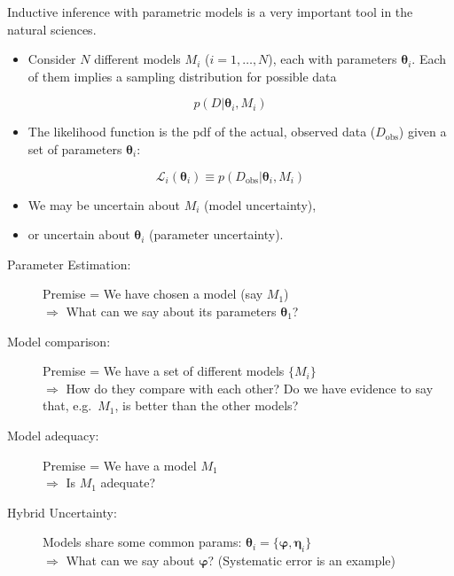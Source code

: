 \documentclass[%
oneside,                 %
final,                   %
10pt]{article}
\newenvironment{block_mdfboxadmon}[1][]{
\begin{block_mdfboxmdframed}[frametitle=#1]
}
{
\end{block_mdfboxmdframed}
}
\begin{document}
\begin{block_mdfboxadmon}[]
Inductive inference with parametric models is a very important tool in the natural sciences.
\begin{itemize}
\item Consider $N$ different models $M_i$ ($i = 1, \ldots, N$), each with parameters $\boldsymbol{\theta}_i$. Each of them implies a sampling distribution for possible data
\end{itemize}

\noindent
\[
p(D|\boldsymbol{\theta}_i, M_i)
\]

\begin{itemize}
\item The likelihood function is the pdf of the actual, observed data ($D_\mathrm{obs}$) given a set of parameters $\boldsymbol{\theta}_i$:
\end{itemize}

\noindent
\[
\mathcal{L}_i (\boldsymbol{\theta}_i) \equiv p(D_\mathrm{obs}|\boldsymbol{\theta}_i, M_i)
\]
\begin{itemize}
\item We may be uncertain about $M_i$ (model uncertainty),

\item or uncertain about $\boldsymbol{\theta}_i$ (parameter uncertainty).
\end{itemize}

\noindent
\end{block_mdfboxadmon} %




\begin{block_mdfboxadmon}[]
\begin{description}
\item[Parameter Estimation:] 
  Premise = We have chosen a model (say $M_1$)\\
  $\Rightarrow$ What can we say about its parameters $\boldsymbol{\theta}_1$?

\item[Model comparison:] 
  Premise = We have a set of different models $\{M_i\}$\\
  $\Rightarrow$ How do they compare with each other? Do we have evidence to say that, e.g.~$M_1$, is better than the other models?

\item[Model adequacy:] 
  Premise = We have a model $M_1$\\
  $\Rightarrow$ Is $M_1$ adequate?

\item[Hybrid Uncertainty:] 
  Models share some common params: $\boldsymbol{\theta}_i = \{ \boldsymbol{\varphi}, \boldsymbol{\eta}_i\}$\\
  $\Rightarrow$ What can we say about $\boldsymbol{\varphi}$? (Systematic error is an example)
\end{description}

\noindent
\end{block_mdfboxadmon} %
\end{document}
